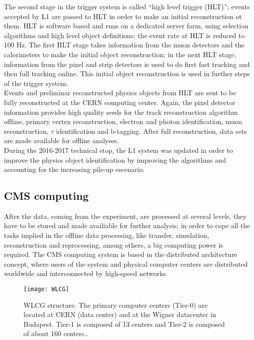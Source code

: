 \noindent The second stage in the trigger system is called ``high level trigger (HLT)''; events accepted by L1 are passed to HLT in order to make an initial reconstruction ot them. HLT is software based and runs on a dedicated server farm, using selection algorithms and high level object definitions; the event rate at HLT is reduced to 100 Hz. The first HLT stage takes information from the muon detectors and the calorimeters to make the initial object reconstruction; in the next HLT stage, information from the pixel and strip detectors is used to do first fast tracking and then full tracking online. This initial object reconstruction is used in further steps of the trigger system. \\

\noindent Events and preliminar reconstructed physics objects from HLT are sent to be fully reconstructed at the CERN computing center. Again, the pixel detector information provides high quality seeds for the track reconstruction algorithm offline, primary vertex reconstruction, electron and photon identification, muon reconstruction, $\tau$ identification and b-tagging. After full reconstruction, data sets are made available for offline analyses.\\ 

\noindent During the 2016-2017 technical stop, the L1 system was updated in order to improve the physics object identification by improving the algorithms and accounting for the increasing pile-up escenario.  

\subsection{CMS computing}

\noindent After the data, coming from the experiment, are processed at several levels, they have to be stored and made availiable for further analysis; in order to cope all the tasks implied in the offline data processing, like transfer, simulation, reconstruction and reprocessing, among others, a big computing power is required. The CMS computing system is based in the distributed architecture concept, where users of the system and physical computer centers are distributed worldwide and interconnected by high-speed networks.

\begin{figure}[h!]
  \centering
  \texttt{[image: WLCG]}
  \caption[WLCG structure]{WLCG structure. The primary computer centers (Tier-0) are located at CERN (data center) and at the Wigner datacenter in Budapest. Tier-1 is composed of 13 centers and Tier-2 is composed of about 160 centers.\cite{wlcg}. }
  \label{fig:wlcg}
\end{figure}


